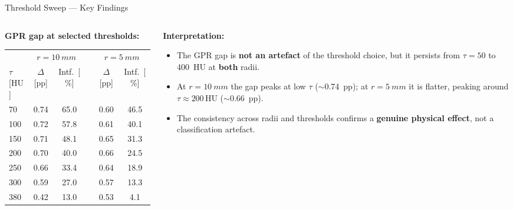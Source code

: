 \documentclass[aspectratio=169, 10pt]{beamer}
\begin{document}
\begin{frame}[shrink=5]{Threshold Sweep — Key Findings}
  \begin{columns}[T]
    \begin{column}{0.52\textwidth}
      \textbf{GPR gap at selected thresholds:}
      \begin{table}
        \centering\small
        \begin{tabular}{lcclcc}
          \toprule
          & \multicolumn{2}{c}{$r = \SI{10}{mm}$}
          & & \multicolumn{2}{c}{$r = \SI{5}{mm}$} \\
          \cmidrule(lr){2-3}\cmidrule(lr){5-6}
          $\tau$ [HU] & $\Delta$ [pp] & Intf.\ [\%]
            & & $\Delta$ [pp] & Intf.\ [\%] \\
          \midrule
           70 & 0.74 & 65.0 & & 0.60 & 46.5 \\
          100 & 0.72 & 57.8 & & 0.61 & 40.1 \\
          150 & 0.71 & 48.1 & & 0.65 & 31.3 \\
          200 & 0.70 & 40.0 & & 0.66 & 24.5 \\
          250 & 0.66 & 33.4 & & 0.64 & 18.9 \\
          300 & 0.59 & 27.0 & & 0.57 & 13.3 \\
          380 & 0.42 & 13.0 & & 0.53 & 4.1 \\
          \bottomrule
        \end{tabular}
      \end{table}
    \end{column}
    \begin{column}{0.45\textwidth}
      \textbf{Interpretation:}
      \begin{itemize}\setlength{\itemsep}{3pt}
        \item The GPR gap is \textbf{not an artefact} of the threshold
              choice, but it persists from $\tau = 50$ to \SI{400}{HU}
              at \textbf{both} radii.
        \item At $r = \SI{10}{mm}$ the gap peaks at low $\tau$
              ($\sim$\SI{0.74}{pp}); at $r = \SI{5}{mm}$ it is
              flatter, peaking around $\tau \approx 200$\,HU
              ($\sim$\SI{0.66}{pp}).
        \item The consistency across radii and thresholds
              confirms a \textbf{genuine physical effect}, not a
              classification artefact.
      \end{itemize}
    \end{column}
  \end{columns}
\end{frame}
\end{document}
